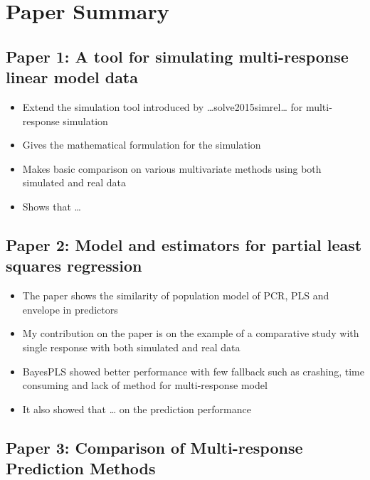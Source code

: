 \documentclass[11pt,twoside,openright,titlepage,
  headinclude,footinclude,BCOR=5mm,
  numbers=noenddot,cleardoublepage=empty,
  tablecaptionabove, dottedtoc,
  bibliography=totoc]{scrreprt}
\providecommand{\tightlist}{%
  \setlength{\itemsep}{0pt}\setlength{\parskip}{0pt}}
\begin{document}
\hypertarget{paper-summary}{%
\chapter{Paper Summary}\label{paper-summary}}

\hypertarget{paper-1-a-tool-for-simulating-multi-response-linear-model-data}{%
\section{Paper 1: A tool for simulating multi-response linear model data}\label{paper-1-a-tool-for-simulating-multi-response-linear-model-data}}

\begin{itemize}
\tightlist
\item
  Extend the simulation tool introduced by \ldots solve2015simrel\ldots{} for multi-response simulation
\item
  Gives the mathematical formulation for the simulation
\item
  Makes basic comparison on various multivariate methods using both simulated and real data
\item
  Shows that \ldots{}
\end{itemize}

\hypertarget{paper-2-model-and-estimators-for-partial-least-squares-regression}{%
\section{Paper 2: Model and estimators for partial least squares regression}\label{paper-2-model-and-estimators-for-partial-least-squares-regression}}

\begin{itemize}
\tightlist
\item
  The paper shows the similarity of population model of PCR, PLS and envelope in predictors
\item
  My contribution on the paper is on the example of a comparative study with single response with both simulated and real data
\item
  BayesPLS showed better performance with few fallback such as crashing, time consuming and lack of method for multi-response model
\item
  It also showed that \ldots{} on the prediction performance
\end{itemize}

\hypertarget{paper-3-comparison-of-multi-response-prediction-methods}{%
\section{Paper 3: Comparison of Multi-response Prediction Methods}\label{paper-3-comparison-of-multi-response-prediction-methods}}
\end{document}
